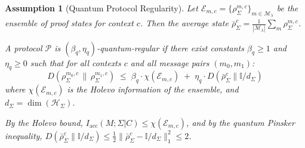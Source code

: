 \documentclass{ieeeaccess}
\newtheorem{assumption}{Assumption}[section]
\begin{document}
\begin{assumption}[Quantum Protocol Regularity]
\label{ass:qregularity}
Let $\mathcal{E}_{m,c} = \{\rho_\Sigma^{m,c}\}_{m \in \mathcal{M}_\lambda}$ be the ensemble of proof states for context $c$. Then the average state $\bar{\rho}_\Sigma^c = \frac{1}{|\mathcal{M}_\lambda|}\sum_m \rho_\Sigma^{m,c}$.

A protocol $\mathcal{P}$ is $(\beta_q, \eta_q)$-\emph{quantum-regular} if there exist constants $\beta_q \geq 1$ and $\eta_q \geq 0$ such that for all contexts $c$ and all message pairs $(m_0, m_1)$:
\begin{equation}
    D\!\left(\rho_\Sigma^{m_0,c} \,\|\, \rho_\Sigma^{m_1,c}\right)
    \;\leq\;
    \beta_q \cdot χ(\mathcal{E}_{m,c})
    \;+\;
    \eta_q \cdot D(\bar{\rho}_\Sigma^c \| \mathbb{I}/d_\Sigma)
\end{equation}
where $χ(\mathcal{E}_{m,c})$ is the Holevo information of the ensemble, and $d_\Sigma = \dim(\mathcal{H}_\Sigma)$.

By the Holevo bound, $I_{\mathrm{acc}}(M;\Sigma|C) \leq χ(\mathcal{E}_{m,c})$, and by the quantum Pinsker inequality, $D(\bar{\rho}_\Sigma^c \| \mathbb{I}/d_\Sigma) \leq \frac{1}{2}\|\bar{\rho}_\Sigma^c - \mathbb{I}/d_\Sigma\|_1^2 \leq 2$.
\end{assumption}
\end{document}
